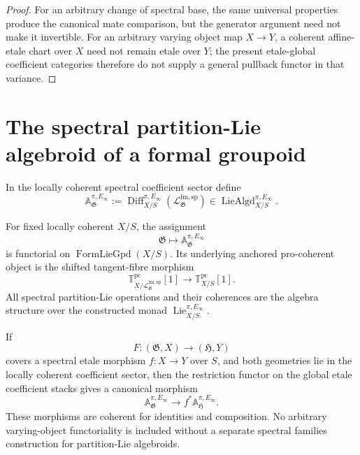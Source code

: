 \begin{proof}
For an arbitrary change of spectral base, the same universal properties
produce the canonical mate comparison, but the generator argument need not
make it invertible.  For an arbitrary varying object map $X\to Y$, a coherent
affine-etale chart over $X$ need not remain etale over $Y$; the present
etale-global coefficient categories therefore do not supply a general pullback
functor in that variance.
\end{proof}

\section{The spectral partition-Lie algebroid of a formal groupoid}
\label{sec:bnla-spectral-groupoid-algebroid}

\begin{definition}
\label{def:bnla-groupoid-spectral-algebroid}
In the locally coherent spectral coefficient sector define
\[
\boxed{
    \mathbb A^{\pi,E_\infty}_{\mathfrak G}
    :=
    \operatorname{Diff}^{\pi,E_\infty}_{X/S}
    \left(\mathcal L^{\mathrm{fm,sp}}_{\mathfrak G}\right)
    \in
    \operatorname{LieAlgd}^{\pi,E_\infty}_{X/S}.}
\]
\end{definition}

\begin{theorem}
\label{thm:bnla-spectral-groupoid-differentiation}
For fixed locally coherent $X/S$, the assignment
\[
    \mathfrak G\longmapsto
    \mathbb A^{\pi,E_\infty}_{\mathfrak G}
\]
is functorial on $\operatorname{FormLieGpd}(X/S)$.  Its underlying anchored
pro-coherent object is the shifted tangent-fibre morphism
\[
\boxed{
    \mathbb T^{\mathrm{pc}}_{X/
      \mathcal L^{\mathrm{fm,sp}}_{\mathfrak G}}[1]
    \longrightarrow
    \mathbb T^{\mathrm{pc}}_{X/S}[1].}
\]
All spectral partition-Lie operations and their coherences are the algebra
structure over the constructed monad
$\operatorname{Lie}^{\pi,E_\infty}_{X/S}$.

If
\[
    F:(\mathfrak G,X)\longrightarrow(\mathfrak H,Y)
\]
covers a spectral etale morphism $f:X\to Y$ over $S$, and both geometries lie
in the locally coherent coefficient sector, then the restriction functor on
the global etale coefficient stacks gives a canonical morphism
\[
\boxed{
    \mathbb A^{\pi,E_\infty}_{\mathfrak G}
    \longrightarrow
    f^*\mathbb A^{\pi,E_\infty}_{\mathfrak H}.}
\]
These morphisms are coherent for identities and composition.  No arbitrary
varying-object functoriality is included without a separate spectral families
construction for partition-Lie algebroids.
\end{theorem}

